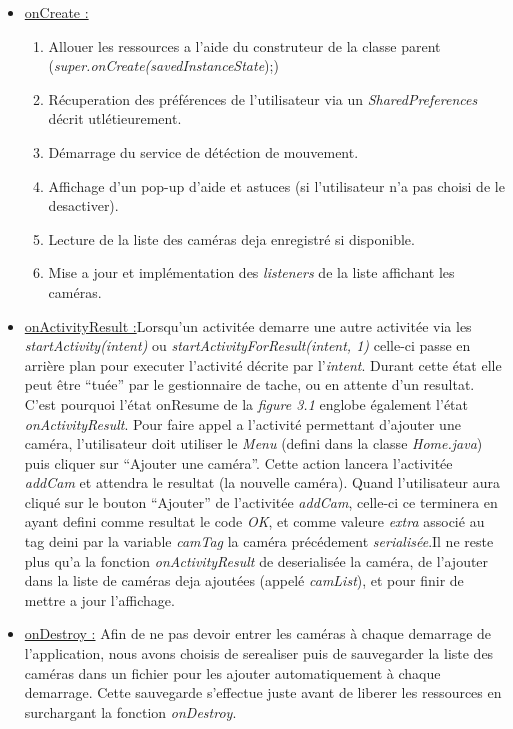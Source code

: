\begin{itemize}
  \item   \underline{onCreate :} \begin{enumerate}
    \item Allouer les ressources a l'aide du construteur de la classe parent
    (\textit{super.onCreate(savedInstanceState});)
    \item Récuperation des préférences de l'utilisateur via un
    \textit{SharedPreferences} décrit utlétieurement.
    \item Démarrage du service de détéction de mouvement.
    \item Affichage d'un pop-up d'aide et astuces (si l'utilisateur n'a pas
    choisi de le desactiver).
    \item Lecture de la liste des caméras deja enregistré si disponible.
    \item Mise a jour et implémentation des \textit{listeners} de la liste
    affichant les caméras.\newline
  \end{enumerate} 
  \item \underline{ onActivityResult :}\newline Lorsqu'un activitée demarre une
  autre activitée via les \textit{startActivity(intent)} ou
  \textit{startActivityForResult(intent, 1)} celle-ci passe en arrière plan pour
  executer l'activité décrite par l'\textit{intent}. Durant cette état elle peut
  être ``tuée'' par le gestionnaire de tache, ou en attente d'un resultat. C'est pourquoi l'état
  onResume de la \textit{figure 3.1} englobe également l'état
  \textit{onActivityResult}.\newline
  Pour faire appel a l'activité permettant d'ajouter une caméra, l'utilisateur
  doit utiliser le \textit{Menu} (defini dans la classe \textit{Home.java}) puis
  cliquer sur ``Ajouter une caméra''. Cette action lancera l'activitée
  \textit{addCam} et attendra le resultat (la nouvelle caméra).
  \newline Quand l'utilisateur aura cliqué sur le bouton ``Ajouter'' de
  l'activitée \textit{addCam}, celle-ci ce terminera en ayant defini comme
  resultat le code \textit{OK}, et comme valeure \textit{extra} associé au tag
  deini par la variable\textit{ camTag} la caméra
  précédement \textit{serialisée}.\newline Il ne reste plus qu'a la fonction
  \textit{onActivityResult} de deserialisée la caméra, de l'ajouter dans la
  liste de caméras deja ajoutées (appelé \textit{camList}), et pour finir de
  mettre a jour l'affichage.\newline
  
  \item \underline{onDestroy :}\newline
  Afin de ne pas devoir entrer les caméras à chaque demarrage de
  l'application, nous avons choisis de serealiser puis de sauvegarder la liste
  des caméras dans un fichier pour les ajouter automatiquement à chaque
  demarrage. Cette sauvegarde s'effectue juste avant de liberer les ressources
  en surchargant la fonction \textit{onDestroy}.  \newline
  \end{itemize}
